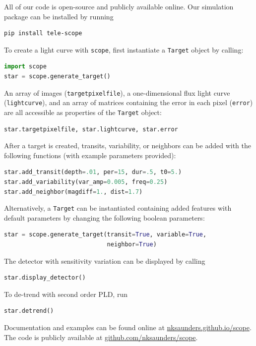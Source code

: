 \documentclass[12pt,preprint]{aastex}
\begin{document}
All of our code is open-source and publicly available online. Our simulation package can be installed by running
%
\begin{lstlisting}[language=bash]
pip install tele-scope
\end{lstlisting}
%
To create a light curve with \texttt{scope}, first instantiate a \texttt{Target} object by calling:
%
\begin{lstlisting}[language=Python]
import scope
star = scope.generate_target()
\end{lstlisting}
%
An array of images (\texttt{targetpixelfile}), a one-dimensional flux light curve (\texttt{lightcurve}), and an array of matrices containing the error in each pixel (\texttt{error}) are all accessible as properties of the \texttt{Target} object:
%
\begin{lstlisting}[language=Python]
star.targetpixelfile, star.lightcurve, star.error
\end{lstlisting}
%
After a target is created, transits, variability, or neighbors can be added with the following functions (with example parameters provided):
%
\begin{lstlisting}[language=Python]
star.add_transit(depth=.01, per=15, dur=.5, t0=5.)
star.add_variability(var_amp=0.005, freq=0.25)
star.add_neighbor(magdiff=1., dist=1.7)
\end{lstlisting}
Alternatively, a \texttt{Target} can be instantiated containing added features with default parameters by changing the following boolean parameters:
%
\begin{lstlisting}[language=Python]
star = scope.generate_target(transit=True, variable=True,
                             neighbor=True)
\end{lstlisting}
%
The detector with sensitivity variation can be displayed by calling
%
\begin{lstlisting}[language=Python]
star.display_detector()
\end{lstlisting}
%
To de-trend with second order PLD, run
\begin{lstlisting}[language=Python]
star.detrend()
\end{lstlisting}

Documentation and examples can be found online at \href{https://nksaunders.github.io/scope}{nksaunders.github.io/scope}. The code is publicly available at
\href{https://github.com/nksaunders/scope}{github.com/nksaunders/scope}.
\end{document}

